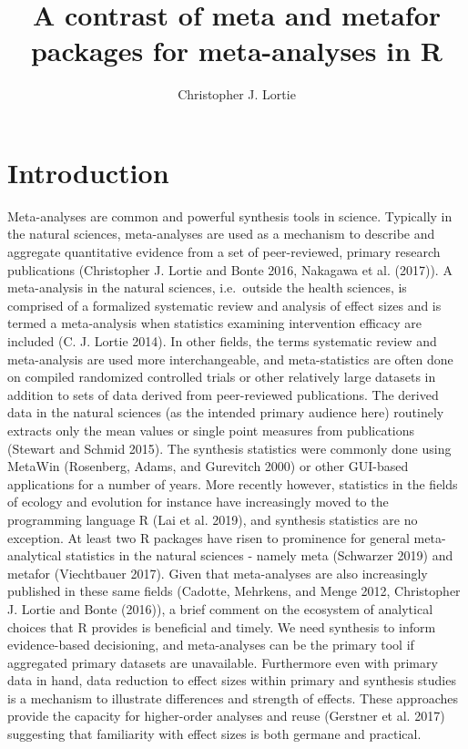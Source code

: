 \documentclass[fleqn,10pt]{wlpeerj} %
\title{A contrast of meta and metafor packages for meta-analyses in R}
\author[1]{Christopher J. Lortie}
\affil[1]{NCEAS, UCSB, Santa Barbara, CA. 93101}
\begin{document}
\flushbottom
\maketitle
\thispagestyle{empty}

\section*{Introduction}\label{introduction}

Meta-analyses are common and powerful synthesis tools in science.
Typically in the natural sciences, meta-analyses are used as a mechanism
to describe and aggregate quantitative evidence from a set of
peer-reviewed, primary research publications (Christopher J. Lortie and
Bonte 2016, Nakagawa et al. (2017)). A meta-analysis in the natural
sciences, i.e.~outside the health sciences, is comprised of a formalized
systematic review and analysis of effect sizes and is termed a
meta-analysis when statistics examining intervention efficacy are
included (C. J. Lortie 2014). In other fields, the terms systematic
review and meta-analysis are used more interchangeable, and
meta-statistics are often done on compiled randomized controlled trials
or other relatively large datasets in addition to sets of data derived
from peer-reviewed publications. The derived data in the natural
sciences (as the intended primary audience here) routinely extracts only
the mean values or single point measures from publications (Stewart and
Schmid 2015). The synthesis statistics were commonly done using MetaWin
(Rosenberg, Adams, and Gurevitch 2000) or other GUI-based applications
for a number of years. More recently however, statistics in the fields
of ecology and evolution for instance have increasingly moved to the
programming language R (Lai et al. 2019), and synthesis statistics are
no exception. At least two R packages have risen to prominence for
general meta-analytical statistics in the natural sciences - namely meta
(Schwarzer 2019) and metafor (Viechtbauer 2017). Given that
meta-analyses are also increasingly published in these same fields
(Cadotte, Mehrkens, and Menge 2012, Christopher J. Lortie and Bonte
(2016)), a brief comment on the ecosystem of analytical choices that R
provides is beneficial and timely. We need synthesis to inform
evidence-based decisioning, and meta-analyses can be the primary tool if
aggregated primary datasets are unavailable. Furthermore even with
primary data in hand, data reduction to effect sizes within primary and
synthesis studies is a mechanism to illustrate differences and strength
of effects. These approaches provide the capacity for higher-order
analyses and reuse (Gerstner et al. 2017) suggesting that familiarity
with effect sizes is both germane and practical.
\end{document}

